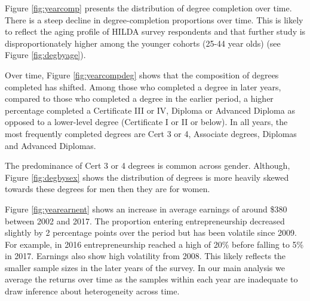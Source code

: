 \documentclass[12pt, a4paper]{article}
\begin{document}
Figure \ref{fig:yearcomp} presents the distribution of degree completion over time. There is a steep decline in degree-completion proportions over time. This is likely to reflect the aging profile of HILDA survey respondents and that further study is disproportionately higher among the younger cohorts (25-44 year olds) (see Figure \ref{fig:degbyage}).

Over time, Figure \ref{fig:yearcompdeg} shows that the composition of degrees completed has shifted. Among those who completed a degree in later years, compared to those who completed a degree in the earlier period, a higher percentage completed a Certificate III or IV, Diploma or Advanced Diploma as opposed to a lower-level degree (Certificate I or II or below). In all years, the most frequently completed degrees are Cert 3 or 4, Associate degrees, Diplomas and Advanced Diplomas. 



The predominance of Cert 3 or 4 degrees is common across gender. Although, Figure \ref{fig:degbysex} shows the distribution of degrees is more heavily skewed towards these degrees for men then they are for women. 

Figure \ref{fig:yearearnent} shows an increase in average earnings of around \$380 between 2002 and 2017. The proportion entering entrepreneurship decreased slightly by 2 percentage points over the period but has been volatile since 2009. For example, in 2016 entrepreneurship reached a high of 20\% before falling to 5\% in 2017. Earnings also show high volatility from 2008. This likely reflects the smaller sample sizes in the later years of the survey. In our main analysis we average the returns over time as the samples within each year are inadequate to draw inference about heterogeneity across time. 
\end{document}
